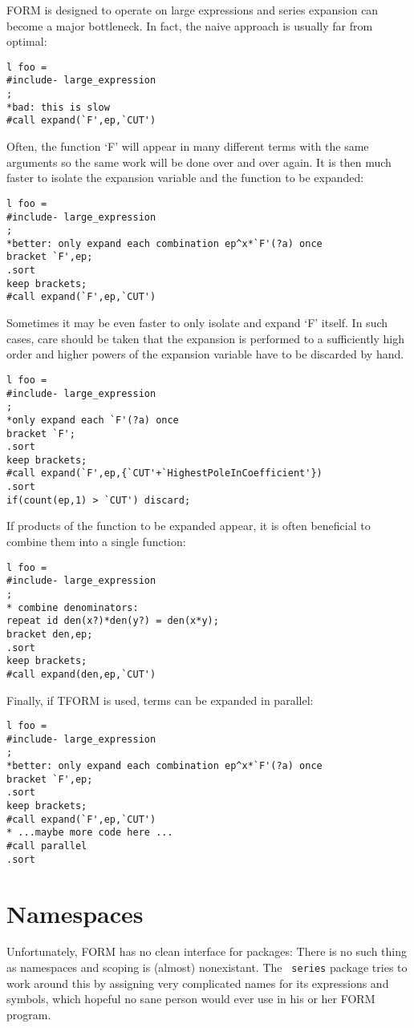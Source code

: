 \documentclass[titlepage]{article}
\begin{document}
FORM is designed to operate on large expressions and series expansion
can become a major bottleneck. In fact, the naive approach is usually
far from optimal:
\begin{verbatim}
l foo =
#include- large_expression
;
*bad: this is slow
#call expand(`F',ep,`CUT')
\end{verbatim}
Often, the function `F' will appear in many different terms with the
same arguments so the same work will be done over and over again. It is
then much faster to isolate the expansion variable and the function to
be expanded:
\begin{verbatim}
l foo =
#include- large_expression
;
*better: only expand each combination ep^x*`F'(?a) once
bracket `F',ep;
.sort
keep brackets;
#call expand(`F',ep,`CUT')
\end{verbatim}
Sometimes it may be even faster to only isolate and expand `F'
itself. In such cases, care should be taken that the expansion is
performed to a sufficiently high order and higher powers of the
expansion variable have to be discarded by hand.
\begin{verbatim}
l foo =
#include- large_expression
;
*only expand each `F'(?a) once
bracket `F';
.sort
keep brackets;
#call expand(`F',ep,{`CUT'+`HighestPoleInCoefficient'})
.sort
if(count(ep,1) > `CUT') discard;
\end{verbatim}
If products of the function to be expanded appear, it is often
beneficial to combine them into a single function:
\begin{verbatim}
l foo =
#include- large_expression
;
* combine denominators:
repeat id den(x?)*den(y?) = den(x*y);
bracket den,ep;
.sort
keep brackets;
#call expand(den,ep,`CUT')
\end{verbatim}
Finally, if TFORM is used, terms can be expanded in parallel:
\begin{verbatim}
l foo =
#include- large_expression
;
*better: only expand each combination ep^x*`F'(?a) once
bracket `F',ep;
.sort
keep brackets;
#call expand(`F',ep,`CUT')
* ...maybe more code here ...
#call parallel
.sort
\end{verbatim}

\section{Namespaces}
\label{sec:namesp}

Unfortunately, FORM has no clean interface for packages: There is no
such thing as namespaces and scoping is (almost) nonexistant. The {\tt
  series} package tries to work around this by assigning very complicated
names for its expressions and symbols, which hopeful no sane person
would ever use in his or her FORM program.
\end{document}
